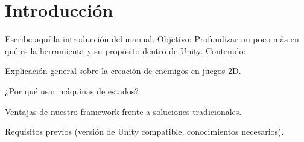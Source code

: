 \section{Introducción}
Escribe aquí la introducción del manual.
Objetivo: Profundizar un poco más en qué es la herramienta y su propósito dentro de Unity.
Contenido:

Explicación general sobre la creación de enemigos en juegos 2D.

¿Por qué usar máquinas de estados?

Ventajas de nuestro framework frente a soluciones tradicionales.

Requisitos previos (versión de Unity compatible, conocimientos necesarios).